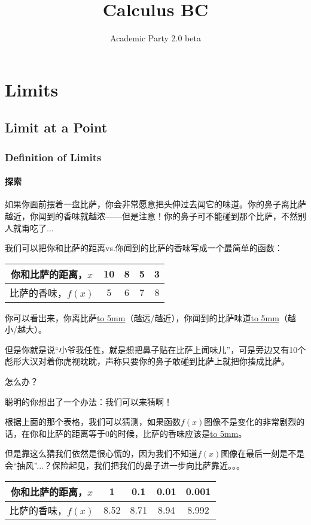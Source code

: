 \documentclass[UTF8]{ctexart}
\title{Calculus BC}
\author{Academic Party 2.0 beta}
\begin{document}
\maketitle
\tableofcontents
\section{Limits}
\subsection{Limit at a Point}
\subsubsection{Definition of Limits}
\paragraph{探索}
如果你面前摆着一盘比萨，你会非常愿意把头伸过去闻它的味道。你的鼻子离比萨越近，你闻到的香味就越浓——但是注意！你的鼻子可不能碰到那个比萨，不然别人就甭吃了... 

我们可以把你和比萨的距离vs.你闻到的比萨的香味写成一个最简单的函数：
\begin{center}
\begin{tabular}{c|c|c|c|c}
\hline
你和比萨的距离，$x$ & 10 & 8 & 5& 3 \\
\hline
比萨的香味，$f(x)$ & 5 & 6 & 7 & 8\\
\hline
\end{tabular}
\end{center}

你可以看出来，你离比萨\underline{\hbox to 5mm{}}（越远/越近），你闻到的比萨味道\underline{\hbox to 5mm{}}（越小/越大）。

但是你就是说“小爷我任性，就是想把鼻子贴在比萨上闻味儿”，可是旁边又有10个彪形大汉对着你虎视眈眈，声称只要你的鼻子敢碰到比萨上就把你揍成比萨。

怎么办？

聪明的你想出了一个办法：我们可以来猜啊！

根据上面的那个表格，我们可以猜测，如果函数$f(x)$图像不是变化的非常剧烈的话，在你和比萨的距离等于0的时候，比萨的香味应该是\underline{\hbox to 5mm{}}。

但是靠这么猜我们依然是很心慌的，因为我们不知道$f(x)$图像在最后一刻是不是会“抽风”...？保险起见，我们把我们的鼻子进一步向比萨靠近。。。
\begin{center}
\begin{tabular}{c|c|c|c|c}
\hline
你和比萨的距离，$x$  & 1 & 0.1 & 0.01& 0.001 \\
\hline
比萨的香味，$f(x)$ & 8.52 & 8.71 & 8.94 & 8.992\\
\hline
\end{tabular}
\end{center}
\end{document}

